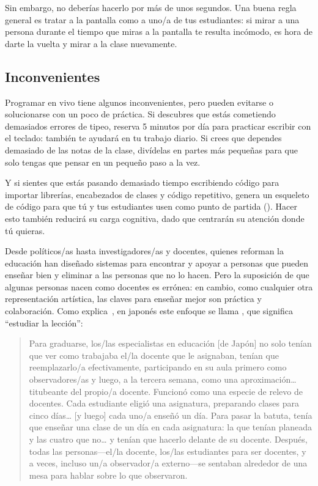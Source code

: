 Sin embargo, no deberías hacerlo por más de unos segundos.
Una buena regla general es tratar a la pantalla como a uno/a de tus estudiantes:
si mirar a una persona durante el tiempo que miras a la pantalla te resulta incómodo, es hora de darte la vuelta y mirar a la clase nuevamente.

\subsection*{Inconvenientes}

Programar en vivo tiene algunos inconvenientes,
pero pueden evitarse o solucionarse con un poco de práctica.
Si descubres que estás cometiendo demasiados errores de tipeo,
reserva 5 minutos por día para practicar escribir con el teclado:
también te ayudará en tu trabajo diario.
Si crees que dependes demasiado de las notas de la clase,
divídelas en partes más pequeñas
para que solo tengas que pensar en un pequeño paso a la vez.

Y si sientes que estás pasando demasiado tiempo escribiendo código para importar librerías, encabezados de clases y código repetitivo,
genera un esqueleto de código para que tú y tus estudiantes usen como punto de partida ().
Hacer esto también reducirá su carga cognitiva,
dado que centrarán su atención donde tú quieras.


Desde políticos/as hasta investigadores/as y docentes,
quienes reforman la educación han diseñado sistemas
para encontrar y apoyar a personas que pueden enseñar bien
y eliminar a las personas que no lo hacen.
Pero la suposición de que algunas personas nacen como docentes es errónea:
en cambio,
como cualquier otra representación artística,
las claves para enseñar mejor son práctica y colaboración.
Como explica~\cite{Gree2014},
en japonés este enfoque se llama ,
que significa ``estudiar la lección'':

\begin{quote}

  Para graduarse,
  los/las especialistas en educación [de Japón] no solo tenían que ver como trabajaba el/la docente que le asignaban,
  tenían que reemplazarlo/a efectivamente,
  participando en su aula primero como observadores/as y luego,
  a la tercera semana,
  como una aproximación{\ldots}titubeante del propio/a docente.
  Funcionó como una especie de relevo de docentes.
  Cada estudiante eligió una asignatura,
  preparando clases para cinco días{\ldots} [y luego] cada uno/a enseñó un día.
  Para pasar la batuta,
  tenía que enseñar una clase de un día en cada asignatura:
  la que tenían planeada y las cuatro que no{\ldots}
  y tenían que hacerlo delante de su docente.
  Después, todas las personas---el/la docente, los/las estudiantes para ser docentes,
  y a veces, incluso un/a observador/a externo---se sentaban alrededor de una mesa
  para hablar sobre lo que observaron.

\end{quote}

